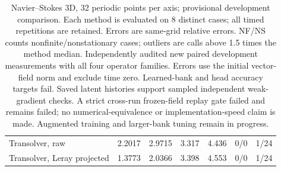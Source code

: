 \begin{table}[htbp]
\begin{tabular}{lrrrrrr}
Transolver, raw & 2.2017 & 2.9715 & 3.317 & 4.436 & 0/0 & 1/24 \\
Transolver, Leray projected & 1.3773 & 2.0366 & 3.398 & 4.553 & 0/0 & 1/24 \\
\bottomrule
\end{tabular}
\caption{Navier–Stokes 3D, 32 periodic points per axis; provisional development comparison. Each method is evaluated on 8 distinct cases; all timed repetitions are retained. Errors are same-grid relative errors. NF/NS counts nonfinite/nonstationary cases; outliers are calls above 1.5 times the method median. Independently audited new paired development measurements with all four operator families. Errors use the initial vector-field norm and exclude time zero. Learned-bank and head accuracy targets fail. Saved latent histories support sampled independent weak-gradient checks. A strict cross-run frozen-field replay gate failed and remains failed; no numerical-equivalence or implementation-speed claim is made. Augmented training and larger-bank tuning remain in progress.}
\label{tab:ns3d-extra03-n32}
\end{table}
